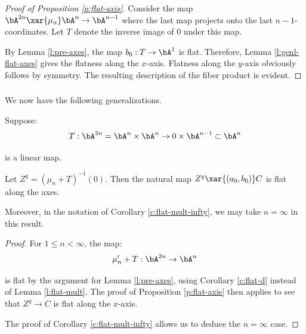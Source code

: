 \begin{proof}[Proof of Proposition \ref{p:flat-axis}]

Consider the map $\bA^{2n} \xar{\mu_n} \bA^n \to \bA^{n-1}$ where
the last map projects onto the last $n-1$-coordinates.
Let $T$ denote the inverse image of $0$ under this map.

By Lemma \ref{l:pre-axes}, the map $b_0:T \to \bA^1$ is flat.
Therefore, Lemma \ref{l:genl-flat-axes} gives the flatness along
the $x$-axis. Flatness along the $y$-axis obviously
follows by symmetry.
The resulting description of the fiber product is
evident.

\end{proof}

\subsubsection{}

We now have the following generalizations.

\begin{cor}
\notready\label{c:flat-axis-d}

Suppose:
%
\[
T:\bA^{2n} = \bA^{n} \times \bA^{n} \to 0 \times \bA^{n-1} \subset \bA^n
\]

 is a linear map.

Let $Z^q = (\mu_n+T)^{-1}(0)$. Then the natural map
$Z^q \xar{(a_0,b_0)} C$ is flat along the axes.

Moreover, in the notation of Corollary \ref{c:flat-mult-infty}, we may take
$n = \infty$ in this result.

\end{cor}

\begin{proof}

For $1\leq n<\infty$, the map:
%
\[
\mu_n^{\prime}+T:\bA^{2n} \to \bA^n
\]

 is flat by the argument for Lemma \ref{l:pre-axes},
using Corollary \ref{c:flat-d} instead of Lemma \ref{l:flat-mult}.
The proof of Proposition \ref{p:flat-axis} then applies to see that
$Z^q \to C$ is flat along the $x$-axis.

The proof of Corollary \ref{c:flat-mult-infty} allows us to deduce the
$n = \infty$ case.

\end{proof}

\subsubsection{}

